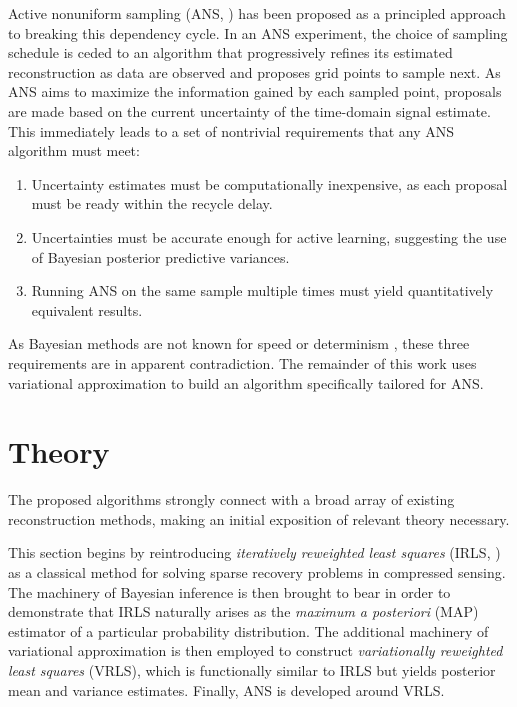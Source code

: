 \documentclass[final,5p,times,twocolumn]{elsarticle}
\begin{document}
Active nonuniform sampling (ANS, \cite{worley:cmr2018}) has been proposed as
a principled approach to breaking this dependency cycle. In an ANS
experiment, the choice of sampling schedule is ceded to an algorithm
that progressively refines its estimated reconstruction as data are
observed and proposes grid points to sample next. As ANS aims to maximize
the information gained by each sampled point, proposals are made based on
the current uncertainty of the time-domain signal estimate. This immediately
leads to a set of nontrivial requirements that any ANS algorithm must meet:
\begin{enumerate}
 \item Uncertainty estimates must be computationally inexpensive, as each
  proposal must be ready within the recycle delay.
 \item Uncertainties must be accurate enough for active learning,
  suggesting the use of Bayesian posterior predictive variances.
 \item Running ANS on the same sample multiple times must yield
  quantitatively equivalent results.
\end{enumerate}
As Bayesian methods are not known for speed or determinism
\cite{bretthorst1988,bretthorst:jmr1990a,bretthorst:jmr1990b,%
bretthorst:jmr1990c},
these three requirements are in apparent contradiction. The remainder of this
work uses variational approximation \cite{worley:cmr2018,bishop2007} to build
an algorithm specifically tailored for ANS.

\section{Theory}
\label{sec:theory}
The proposed algorithms strongly connect with a broad array of existing
reconstruction methods, making an initial exposition of relevant theory
necessary.

This section begins by reintroducing \emph{iteratively reweighted least
squares} (IRLS, \cite{daubechies:cpam2010,kazimierczuk:jmr2011}) as a
classical method for solving sparse recovery problems in compressed sensing.
The machinery of Bayesian inference is then brought to bear in order to
demonstrate that IRLS naturally arises as the \emph{maximum a posteriori}
(MAP) estimator of a particular probability distribution. The additional
machinery of variational approximation is then employed to construct
\emph{variationally reweighted least squares} (VRLS), which is functionally
similar to IRLS but yields posterior mean and variance estimates.
Finally, ANS is developed around VRLS.
\end{document}
